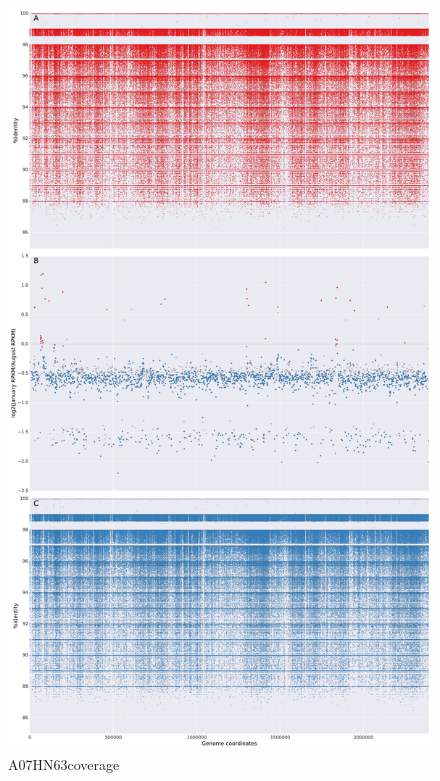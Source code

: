 \begin{figure}[!hbtp]
  \centering
  \includegraphics[width=\textwidth,height=\textheight,keepaspectratio]{Chapter5/Figures/coverage_plots/A07HN63_coverage.pdf}
  \caption{A07HN63coverage}
  \label{A07HN63coverage}
\end{figure}


